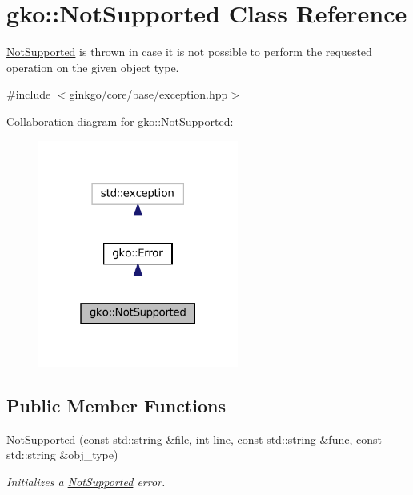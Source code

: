 \hypertarget{classgko_1_1NotSupported}{}\section{gko\+:\+:Not\+Supported Class Reference}
\label{classgko_1_1NotSupported}


\hyperlink{classgko_1_1NotSupported}{Not\+Supported} is thrown in case it is not possible to perform the requested operation on the given object type.  




{\ttfamily \#include $<$ginkgo/core/base/exception.\+hpp$>$}



Collaboration diagram for gko\+:\+:Not\+Supported\+:
\nopagebreak
\begin{figure}[H]
\begin{center}
\leavevmode
\includegraphics[width=187pt]{classgko_1_1NotSupported__coll__graph}
\end{center}
\end{figure}
\subsection*{Public Member Functions}
\begin{DoxyCompactItemize}
\item 
\hyperlink{classgko_1_1NotSupported_ae4d84be2a2a769e0877c4aeb75e44794}{Not\+Supported} (const std\+::string \&file, int line, const std\+::string \&func, const std\+::string \&obj\+\_\+type)
\begin{DoxyCompactList}\small\item\em Initializes a \hyperlink{classgko_1_1NotSupported}{Not\+Supported} error. \end{DoxyCompactList}\end{DoxyCompactItemize}


